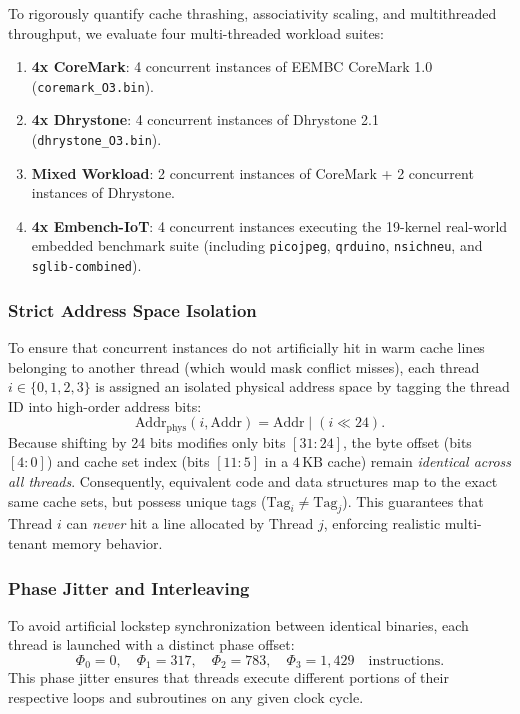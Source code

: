 To rigorously quantify cache thrashing, associativity scaling, and multithreaded throughput, we evaluate four multi-threaded workload suites:
\begin{enumerate}
    \item \textbf{4x CoreMark}: 4 concurrent instances of EEMBC CoreMark 1.0 (\texttt{coremark\_O3.bin}).
    \item \textbf{4x Dhrystone}: 4 concurrent instances of Dhrystone 2.1 (\texttt{dhrystone\_O3.bin}).
    \item \textbf{Mixed Workload}: 2 concurrent instances of CoreMark + 2 concurrent instances of Dhrystone.
    \item \textbf{4x Embench-IoT}: 4 concurrent instances executing the 19-kernel real-world embedded benchmark suite (including \texttt{picojpeg}, \texttt{qrduino}, \texttt{nsichneu}, and \texttt{sglib-combined}).
\end{enumerate}

\subsubsection{Strict Address Space Isolation}
To ensure that concurrent instances do not artificially hit in warm cache lines belonging to another thread (which would mask conflict misses), each thread $i \in \{0, 1, 2, 3\}$ is assigned an isolated physical address space by tagging the thread ID into high-order address bits:
\begin{equation}
\text{Addr}_{\text{phys}}(i, \text{Addr}) = \text{Addr} \mid (i \ll 24).
\end{equation}
Because shifting by 24 bits modifies only bits $[31:24]$, the byte offset (bits $[4:0]$) and cache set index (bits $[11:5]$ in a $4\,\text{KB}$ cache) remain \textit{identical across all threads}. Consequently, equivalent code and data structures map to the exact same cache sets, but possess unique tags ($\text{Tag}_i \ne \text{Tag}_j$). This guarantees that Thread $i$ can \emph{never} hit a line allocated by Thread $j$, enforcing realistic multi-tenant memory behavior.

\subsubsection{Phase Jitter and Interleaving}
To avoid artificial lockstep synchronization between identical binaries, each thread is launched with a distinct phase offset:
\begin{equation}
\Phi_0 = 0, \quad \Phi_1 = 317, \quad \Phi_2 = 783, \quad \Phi_3 = 1,429 \quad \text{instructions}.
\end{equation}
This phase jitter ensures that threads execute different portions of their respective loops and subroutines on any given clock cycle.

